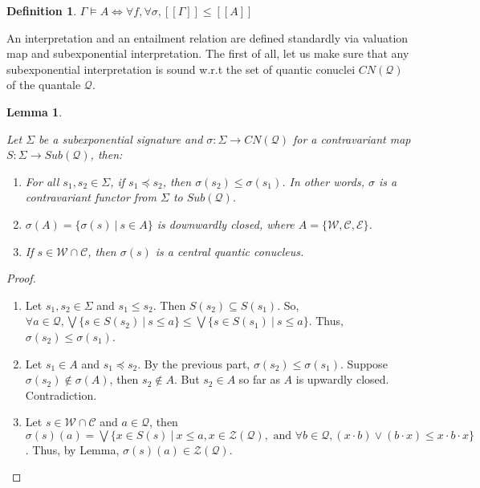 \documentclass[a4paper]{article}
\theoremstyle{defin}
\newtheorem{defin}{Definition}
\theoremstyle{theorem}
\theoremstyle{prop}
\theoremstyle{lemma}
\newtheorem{lemma}{Lemma}
\theoremstyle{ex}
\theoremstyle{col}
\begin{document}
\begin{defin}
  $\Gamma \models A \Leftrightarrow \forall f, \forall \sigma, [\![\Gamma]\!] \leq [\![A]\!]$
\end{defin}

An interpretation and an entailment relation are defined standardly via valuation map and subexponential interpretation.
The first of all, let us make sure that any subexponential interpretation is sound w.r.t the set of quantic conuclei $CN(\mathcal{Q})$ of the quantale $\mathcal{Q}$.


\begin{lemma}
  $ $

  Let $\Sigma$ be a subexponential signature and $\sigma : \Sigma \to CN(\mathcal{Q})$ for a contravariant map
  $S : \Sigma \to Sub(\mathcal{Q})$, then:
  \begin{enumerate}
  \item For all $s_1, s_2 \in \Sigma$, if $s_1 \preceq s_2$, then $\sigma(s_2) \leq \sigma(s_1)$.
  In other words, $\sigma$ is a contravariant functor from $\Sigma$ to $Sub(\mathcal{Q})$.
  \item $\sigma(A) = \{ \sigma(s) \: | \: s \in A \}$ is downwardly closed, where $A = \{ \mathcal{W}, \mathcal{C}, \mathcal{E} \}$.
  \item If $s \in \mathcal{W} \cap \mathcal{C}$, then $\sigma(s)$ is a central quantic conucleus.
\end{enumerate}
\end{lemma}

\begin{proof}
  $ $

  \begin{enumerate}
  \item Let $s_1, s_2 \in \Sigma$ and $s_1 \leq s_2$. Then $S(s_2) \subseteq S(s_1)$.
  So, $\forall a \in \mathcal{Q}, \bigvee \{ s \in S(s_2) \: | \: s \leq a \} \leq \bigvee \{ s \in S(s_1) \: | \: s \leq a \}$. Thus, $\sigma(s_2) \leq \sigma(s_1)$.
  \item Let $s_1 \in A$ and $s_1 \preceq s_2$. By the previous part, $\sigma(s_2) \leq \sigma(s_1)$. Suppose $\sigma(s_2) \notin \sigma(A)$, then $s_2 \notin A$. But $s_2 \in A$ so far as $A$ is upwardly closed. Contradiction.
  \item Let $s \in \mathcal{W} \cap \mathcal{C}$ and $a \in \mathcal{Q}$,
  then $\sigma(s)(a) = \bigvee \{ x \in S(s) \: | \: x \leq a, x \in \mathcal{Z}(\mathcal{Q}), \text{ and } \forall b \in \mathcal{Q}, (x \cdot b) \vee (b \cdot x) \leq x \cdot b \cdot x \}$. Thus, by Lemma, $\sigma(s)(a) \in \mathcal{Z}(\mathcal{Q})$.

\end{enumerate}
\end{proof}
\end{document}
